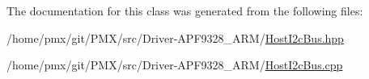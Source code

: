 The documentation for this class was generated from the following files\+:\begin{DoxyCompactItemize}
\item 
/home/pmx/git/\+P\+M\+X/src/\+Driver-\/\+A\+P\+F9328\+\_\+\+A\+R\+M/\hyperlink{HostI2cBus_8hpp}{Host\+I2c\+Bus.\+hpp}\item 
/home/pmx/git/\+P\+M\+X/src/\+Driver-\/\+A\+P\+F9328\+\_\+\+A\+R\+M/\hyperlink{HostI2cBus_8cpp}{Host\+I2c\+Bus.\+cpp}\end{DoxyCompactItemize}
